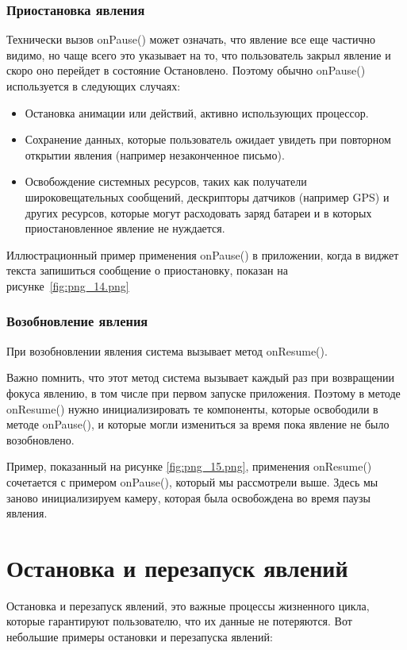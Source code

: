 \subsubsection{Приостановка явления}
Технически вызов onPause() может означать, что явление все еще частично
видимо, но чаще всего это указывает на то, что пользователь закрыл явление 
и скоро оно перейдет в состояние Остановлено.
Поэтому обычно onPause()
используется в следующих случаях:
\begin{itemize}
	\item Остановка анимации или действий, активно использующих процессор.
	\item Сохранение данных, которые пользователь ожидает увидеть при
		повторном открытии явления (например незаконченное письмо).
	\item Освобождение системных ресурсов, таких как получатели
		широковещательных сообщений, дескрипторы датчиков (например GPS)
		и других ресурсов, которые могут расходовать заряд батареи
		и в которых приостановленное явление не нуждается.
\end{itemize}
Иллюстрационный пример применения onPause() в приложении,
когда в виджет текста запишиться сообщение о приостановку, показан
на рисунке~\ref{fig:png_14.png}


\subsubsection{Возобновление явления}
При возобновлении явления система вызывает метод onResume().\par
Важно помнить, что этот метод система вызывает каждый раз при
возвращении фокуса явлению, в том числе при первом запуске приложения.
Поэтому в методе onResume() нужно инициализировать те компоненты,
которые освободили в методе onPause(), и которые могли измениться за
время пока явление не было возобновлено.\par
Пример, показанный на рисунке \ref{fig:png_15.png}, применения
onResume() сочетается с примером onPause(), который мы рассмотрели выше.
Здесь мы заново инициализируем камеру, которая была освобождена во время
паузы явления.


\section{Остановка и перезапуск явлений}
Остановка и перезапуск явлений, это важные процессы жизненного цикла,
которые гарантируют пользователю, что их данные не потеряются. Вот
небольшие примеры остановки и перезапуска явлений:

